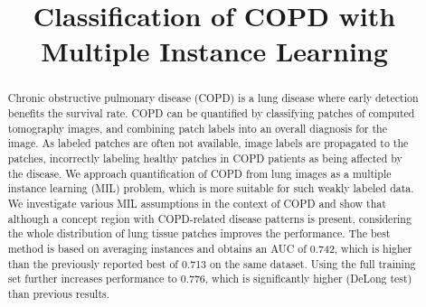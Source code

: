 \documentclass[10pt,conference,a4paper]{IEEEtran}
\begin{document}
\title{Classification of COPD with \\ Multiple Instance Learning}


\author{



}









\maketitle

\begin{abstract}
Chronic obstructive pulmonary disease (COPD) is a lung disease where early detection benefits the survival rate. COPD can be quantified by classifying patches of computed tomography images, and combining patch labels into an overall diagnosis for the image. As labeled patches are often not available, image labels are propagated to the patches, incorrectly labeling healthy patches in COPD patients as being affected by the disease. We approach quantification of COPD from lung images as a multiple instance learning (MIL) problem, which is more suitable for such weakly labeled data. We investigate various MIL assumptions in the context of COPD and show that although a concept region with COPD-related disease patterns is present, considering the whole distribution of lung tissue patches improves the performance. The best method is based on averaging instances and obtains an AUC of 0.742, which is higher than the previously reported best of 0.713 on the same dataset. Using the full training set further increases performance to 0.776, which is significantly higher (DeLong test) than previous results.

\end{abstract}
\end{document}
